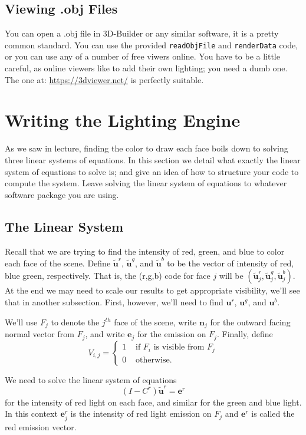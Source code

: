 \documentclass{article}
\renewcommand{\v}[1]{\mathbf{#1}}
\newcommand{\tu}{\tilde{u}}
\begin{document}
\subsection*{Viewing .obj Files}
You can open a .obj file in 3D-Builder or any similar software, it is a pretty common standard.  You can use the provided \texttt{readObjFile} and \texttt{renderData} code, or you can use any of a number of free viwers online. You have to be a little careful, as online viewers like to add their own lighting; you need a dumb one.  The one at: \href{https://3dviewer.net/}{https://3dviewer.net/} is perfectly suitable. 


\section*{Writing the Lighting Engine}
As we saw in lecture, finding the color to draw each face boils down to solving three linear systems of equations.  In this section we detail what exactly the linear system of equations to solve is; and give an idea of how to structure your code to compute the system.  Leave solving the linear system of equations to whatever software package you are using. 

\subsection*{The Linear System}
Recall that we are trying to find the intensity of red, green, and blue to color each face of the scene.  Define $\v \tu^r$, $\v \tu^g$, and $\v \tu^b$ to be the vector of intensity of red, blue green, respectively.  That is, the (r,g,b) code for face $j$ will be $(\v \tu^r_j,\v \tu^g_j, \v \tu^b_j )$. At the end we may need to scale our results to get appropriate visibility, we'll see that in another subsection.  First, however, we'll need to find $\v u^r$, $\v u^g$, and $\v u^b$. 

We'll use $F_j$ to denote the $j^{th}$ face of the scene, write $\v n_j$ for the outward facing normal vector from $F_j$, and write $\v e_j$ for the emission on $F_j$.  Finally, define 
\[V_{i,j}=\begin{cases}
    1&\text{ if } F_i \text{ is visible from } F_j\\
    0&\text{ otherwise.}
\end{cases}\]

We need to solve the linear system of equations
\[(I-C^r)\v \tu^r = \v e^r\]
for the intensity of red light on each face, and similar for the green and blue light.  In this context $\v e^r_j$ is the intensity of red light emission on $F_j$ and $\v e^r$ is called the red emission vector. 
\end{document}
